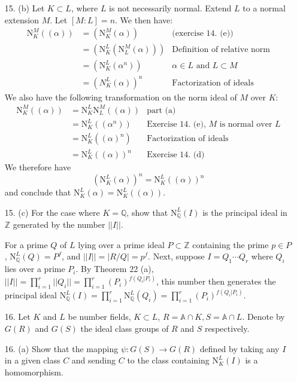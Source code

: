 \documentclass{article}
\newcommand{\Q}[0]{\mathbb{Q}}
\newcommand{\Z}[0]{\mathbb{Z}}
\newcommand{\norm}[0]{\text{N}}
\newcommand{\ringofintegers}[1]{\mathbb{A} \cap #1}
\begin{document}
\begin{enumerate}
\item[15. (b)] Let $K \subset L$, where $L$ is not necessarily normal.  Extend $L$ to a normal extension $M$.  Let $[M : L] = n$.  We then have:\begin{align*}\norm^{M}_{K}((\alpha)) &= (\norm^{M}_{K}(\alpha)) & \text{(exercise 14. (e))} \\ &= (\norm^{L}_{K}(\norm^{M}_{L}(\alpha))) & \text{Definition of relative norm} \\ &= (\norm^{L}_{K}(\alpha^n)) & \text{$\alpha \in L$ and $L \subset M$} \\ &= (N^{L}_{K}(\alpha))^n & \text{Factorization of ideals} \end{align*}
We also have the following transformation on the norm ideal of $M$ over $K$: \begin{align*}
    \norm^{M}_{K}((\alpha)) &= \norm^{L}_{K} \norm^{M}_{L}((\alpha)) & \text{part (a)} \\
    &= \norm^{L}_{K} ((\alpha^n)) & \text{Exercise 14. (e), $M$ is normal over $L$}  \\
    &= \norm^{L}_{K} ((\alpha)^n) & \text{Factorization of ideals}\\
    &= \norm^{L}_{K} ((\alpha))^n & \text{Exercise 14. (d)}
\end{align*}
We therefore have \[ (\norm^{L}_{K}(\alpha))^n = \norm^{L}_{K}((\alpha))^n \] and conclude that $\norm^{L}_{K}(\alpha) = \norm^{L}_{K}((\alpha))$.

\item[15. (c)]  For the case where $K = \Q$, show that $\norm^{L}_{\Q}(I)$ is the principal ideal in $\Z$ generated by the number $||I||$.

For a prime $Q$ of $L$ lying over a prime ideal $P \subset \Z$ containing the prime $p \in P$, $\norm^{L}_{\Q}(Q) = P^f$, and $||I|| = |R/Q| = p^f$.  Next, suppose $I = Q_1 \cdots Q_r$ where $Q_i$ lies over a prime $P_i$.  By Theorem 22 (a), $||I|| = \prod_{i=1}^{r} ||Q_i|| = \prod_{i=1}^{r} (P_i)^{f(Q_i | P_i)}$, this number then generates the principal ideal $\norm^{L}_{\Q}(I) = \prod_{i=1}^{r} \norm^{L}_{\Q}(Q_i) = \prod_{i=1}^{r} (P_i)^{f(Q_i | P_i)}$.

\item[16.] Let $K$ and $L$ be number fields, $K \subset L$, $R = \ringofintegers{K}, S = \ringofintegers{L}$.  Denote by $G(R)$ and $G(S)$ the ideal class groups of $R$ and $S$ respectively.
\item[16. (a)] Show that the mapping $\psi : G(S) \to G(R)$ defined by taking any $I$ in a given class $C$ and sending $C$ to the class containing $\norm^{L}_{K}(I)$ is a homomorphism.


\end{enumerate}
\end{document}

